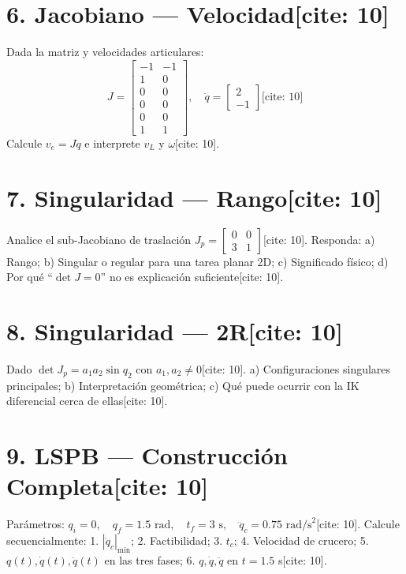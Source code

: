 \documentclass[11pt, a4paper]{article}
\begin{document}
\section*{6. Jacobiano — Velocidad[cite: 10]}
Dada la matriz y velocidades articulares:
\begin{equation*}
    J = \begin{bmatrix} -1 & -1 \\ 1 & 0 \\ 0 & 0 \\ 0 & 0 \\ 0 & 0 \\ 1 & 1 \end{bmatrix}, \quad \dot{q} = \begin{bmatrix} 2 \\ -1 \end{bmatrix} \text{[cite: 10]}
\end{equation*}
Calcule $v_e = J\dot{q}$ e interprete $v_L$ y $\omega$[cite: 10].
\vspace{2cm}

\section*{7. Singularidad — Rango[cite: 10]}
Analice el sub-Jacobiano de traslación $J_p = \begin{bmatrix} 0 & 0 \\ 3 & 1 \end{bmatrix}$[cite: 10].
Responda: a) Rango; b) Singular o regular para una tarea planar 2D; c) Significado físico; d) Por qué “$\det J=0$” no es explicación suficiente[cite: 10].
\vspace{2cm}

\section*{8. Singularidad — 2R[cite: 10]}
Dado $\det J_p = a_1 a_2 \sin q_2$ con $a_1, a_2 \neq 0$[cite: 10].
a) Configuraciones singulares principales; b) Interpretación geométrica; c) Qué puede ocurrir con la IK diferencial cerca de ellas[cite: 10].
\vspace{2cm}

\section*{9. LSPB — Construcción Completa[cite: 10]}
Parámetros: $q_i=0, \quad q_f=1.5 \text{ rad}, \quad t_f=3 \text{ s}, \quad \ddot{q}_c=0.75 \text{ rad/s}^2$[cite: 10].
Calcule secuencialmente: 1. $|\ddot{q}_c|_{\min}$; 2. Factibilidad; 3. $t_c$; 4. Velocidad de crucero; 5. $q(t), \dot{q}(t), \ddot{q}(t)$ en las tres fases; 6. $q, \dot{q}, \ddot{q}$ en $t=1.5$ s[cite: 10].
\vspace{4.5cm}
\end{document}
